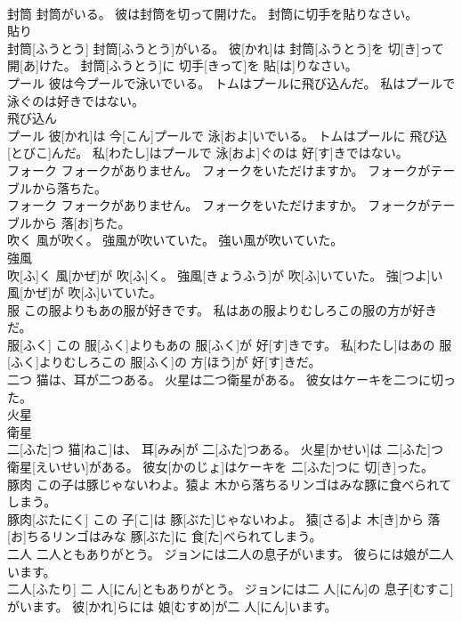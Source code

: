 \documentclass[8pt]{extreport}
\begin{document}
\begin{CJK}{UTF8}{min}
\\	封筒 封筒がいる。 彼は封筒を切って開けた。 封筒に切手を貼りなさい。	
\\	貼り 
\\	封筒[ふうとう] 封筒[ふうとう]がいる。 彼[かれ]は 封筒[ふうとう]を 切[き]って 開[あ]けた。 封筒[ふうとう]に 切手[きって]を 貼[は]りなさい。
\\	プール 彼は今プールで泳いでいる。 トムはプールに飛び込んだ。 私はプールで泳ぐのは好きではない。	
\\	飛び込ん 
\\	プール 彼[かれ]は 今[こん]プールで 泳[およ]いでいる。 トムはプールに 飛び込[とびこ]んだ。 私[わたし]はプールで 泳[およ]ぐのは 好[す]きではない。
\\	フォーク フォークがありません。 フォークをいただけますか。 フォークがテーブルから落ちた。	
\\	フォーク フォークがありません。 フォークをいただけますか。 フォークがテーブルから 落[お]ちた。
\\	吹く 風が吹く。 強風が吹いていた。 強い風が吹いていた。	
\\	強風 
\\	吹[ふ]く 風[かぜ]が 吹[ふ]く。 強風[きょうふう]が 吹[ふ]いていた。 強[つよ]い 風[かぜ]が 吹[ふ]いていた。
\\	服 この服よりもあの服が好きです。 私はあの服よりむしろこの服の方が好きだ。	
\\	服[ふく] この 服[ふく]よりもあの 服[ふく]が 好[す]きです。 私[わたし]はあの 服[ふく]よりむしろこの 服[ふく]の 方[ほう]が 好[す]きだ。
\\	二つ 猫は、耳が二つある。 火星は二つ衛星がある。 彼女はケーキを二つに切った。	
\\	火星 
\\	衛星
\\	二[ふた]つ 猫[ねこ]は、 耳[みみ]が 二[ふた]つある。 火星[かせい]は 二[ふた]つ 衛星[えいせい]がある。 彼女[かのじょ]はケーキを 二[ふた]つに 切[き]った。
\\	豚肉 この子は豚じゃないわよ。猿よ 木から落ちるリンゴはみな豚に食べられてしまう。	
\\	豚肉[ぶたにく] この 子[こ]は 豚[ぶた]じゃないわよ。 猿[さる]よ 木[き]から 落[お]ちるリンゴはみな 豚[ぶた]に 食[た]べられてしまう。
\\	二人 二人ともありがとう。 ジョンには二人の息子がいます。 彼らには娘が二人います。	
\\	二人[ふたり] 二 人[にん]ともありがとう。 ジョンには二 人[にん]の 息子[むすこ]がいます。 彼[かれ]らには 娘[むすめ]が二 人[にん]います。

\end{CJK}
\end{document}

